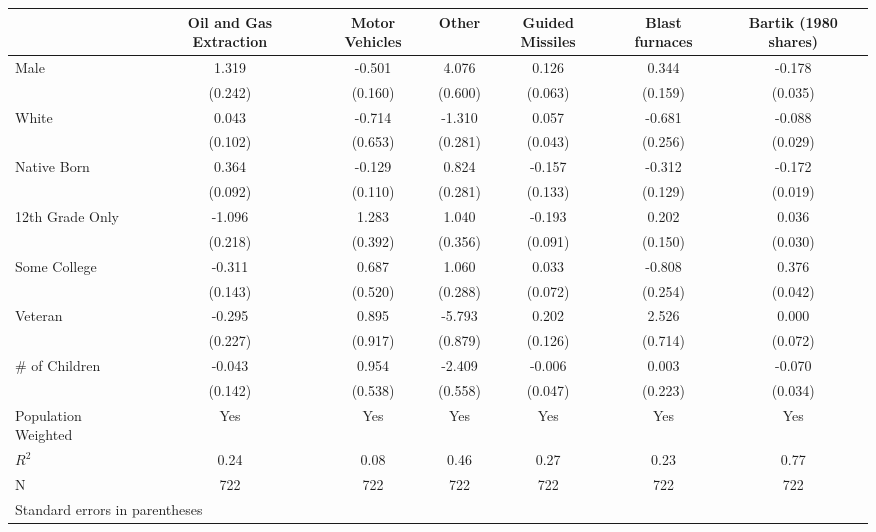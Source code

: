 \begin{tabular}{l*{6}{c}}
\toprule
                &\multicolumn{1}{c}{Oil and Gas Extraction}&\multicolumn{1}{c}{Motor Vehicles}&\multicolumn{1}{c}{Other}&\multicolumn{1}{c}{Guided Missiles}&\multicolumn{1}{c}{Blast furnaces}&\multicolumn{1}{c}{Bartik (1980 shares)}\\
\midrule
Male            &    1.319&   -0.501&    4.076&    0.126&    0.344&   -0.178\\
                &  (0.242)&  (0.160)&  (0.600)&  (0.063)&  (0.159)&  (0.035)\\
White           &    0.043&   -0.714&   -1.310&    0.057&   -0.681&   -0.088\\
                &  (0.102)&  (0.653)&  (0.281)&  (0.043)&  (0.256)&  (0.029)\\
Native Born     &    0.364&   -0.129&    0.824&   -0.157&   -0.312&   -0.172\\
                &  (0.092)&  (0.110)&  (0.281)&  (0.133)&  (0.129)&  (0.019)\\
12th Grade Only &   -1.096&    1.283&    1.040&   -0.193&    0.202&    0.036\\
                &  (0.218)&  (0.392)&  (0.356)&  (0.091)&  (0.150)&  (0.030)\\
Some College    &   -0.311&    0.687&    1.060&    0.033&   -0.808&    0.376\\
                &  (0.143)&  (0.520)&  (0.288)&  (0.072)&  (0.254)&  (0.042)\\
Veteran         &   -0.295&    0.895&   -5.793&    0.202&    2.526&    0.000\\
                &  (0.227)&  (0.917)&  (0.879)&  (0.126)&  (0.714)&  (0.072)\\
\# of Children  &   -0.043&    0.954&   -2.409&   -0.006&    0.003&   -0.070\\
                &  (0.142)&  (0.538)&  (0.558)&  (0.047)&  (0.223)&  (0.034)\\
\midrule
Population Weighted&      Yes&      Yes&      Yes&      Yes&      Yes&      Yes\\
$ R^2$          &     0.24&     0.08&     0.46&     0.27&     0.23&     0.77\\
N               &      722&      722&      722&      722&      722&      722\\
\bottomrule
\multicolumn{7}{l}{\footnotesize Standard errors in parentheses}\\
\end{tabular}
